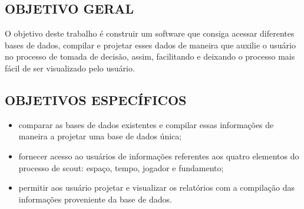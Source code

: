 \subsection{OBJETIVO GERAL}
O objetivo deste trabalho é construir um software que consiga acessar diferentes bases de dados, compilar e projetar esses dados de maneira que auxilie o usuário no processo de tomada de decisão, assim, facilitando e deixando o processo mais fácil de ser visualizado pelo usuário.

\subsection{OBJETIVOS ESPECÍFICOS}
\begin{itemize}
	\item  comparar as bases de dados existentes e compilar essas informações de maneira a projetar uma base de dados única;
	\item fornecer acesso ao usuários de informações referentes aos quatro elementos do processo de scout: espaço, tempo, jogador e fundamento;
	\item permitir aos usuário projetar e visualizar os relatórios com a compilação das informações proveniente da base de dados.
\end{itemize}